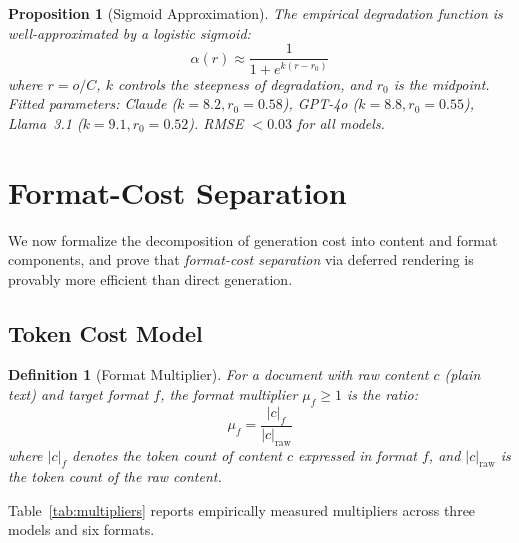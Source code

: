 \documentclass[11pt,twocolumn]{article}
\newtheorem{definition}{Definition}
\newtheorem{proposition}{Proposition}
\newcommand{\fcs}{\textit{format-cost separation}}
\begin{document}
\begin{proposition}[Sigmoid Approximation]
\label{prop:sigmoid}
The empirical degradation function is well-approximated by a
logistic sigmoid:
\begin{equation}
\alpha(r) \approx \frac{1}{1 + e^{k(r - r_0)}}
\label{eq:sigmoid}
\end{equation}
where $r = o/C$, $k$ controls the steepness of degradation, and
$r_0$ is the midpoint.  Fitted parameters: Claude ($k{=}8.2,
r_0{=}0.58$), GPT-4o ($k{=}8.8, r_0{=}0.55$), Llama~3.1
($k{=}9.1, r_0{=}0.52$).  RMSE $< 0.03$ for all models.
\end{proposition}


\section{Format-Cost Separation}
\label{sec:fcs}

We now formalize the decomposition of generation cost into content
and format components, and prove that \fcs{} via deferred rendering
is provably more efficient than direct generation.

\subsection{Token Cost Model}

\begin{definition}[Format Multiplier]
\label{def:multiplier}
For a document with raw content $c$ (plain text) and target format
$f$, the \emph{format multiplier} $\mu_f \geq 1$ is the ratio:
\begin{equation}
\mu_f = \frac{|c|_f}{|c|_{\text{raw}}}
\end{equation}
where $|c|_f$ denotes the token count of content $c$ expressed in
format $f$, and $|c|_{\text{raw}}$ is the token count of the raw
content.
\end{definition}

Table~\ref{tab:multipliers} reports empirically measured multipliers
across three models and six formats.
\end{document}
